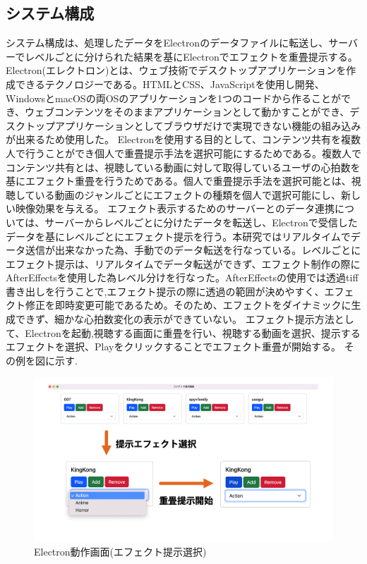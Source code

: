 \subsection{システム構成}
システム構成は、処理したデータをElectronのデータファイルに転送し、サーバーでレベルごとに分けられた結果を基にElectronでエフェクトを重畳提示する。
Electron(エレクトロン)とは、ウェブ技術でデスクトップアプリケーションを作成できるテクノロジーである。HTMLとCSS、JavaScriptを使用し開発、WindowsとmacOSの両OSのアプリケーションを1つのコードから作ることができ、ウェブコンテンツをそのままアプリケーションとして動かすことができ、デスクトップアプリケーションとしてブラウザだけで実現できない機能の組み込みが出来るため使用した。
Electronを使用する目的として、コンテンツ共有を複数人で行うことができ個人で重畳提示手法を選択可能にするためである。複数人でコンテンツ共有とは、視聴している動画に対して取得しているユーザの心拍数を基にエフェクト重畳を行うためである。個人で重畳提示手法を選択可能とは、視聴している動画のジャンルごとにエフェクトの種類を個人で選択可能にし、新しい映像効果を与える。
エフェクト表示するためのサーバーとのデータ連携については、サーバーからレベルごとに分けたデータを転送し、Electronで受信したデータを基にレベルごとにエフェクト提示を行う。本研究ではリアルタイムでデータ送信が出来なかった為、手動でのデータ転送を行なっている。レベルごとにエフェクト提示は、リアルタイムでデータ転送ができず、エフェクト制作の際にAfterEffectsを使用した為レベル分けを行なった。AfterEffectsの使用では透過tiff書き出しを行うことで,エフェクト提示の際に透過の範囲が決めやすく、エフェクト修正を即時変更可能であるため。そのため、エフェクトをダイナミックに生成できず、細かな心拍数変化の表示ができていない。
エフェクト提示方法として、Electronを起動,視聴する画面に重畳を行い、視聴する動画を選択、提示するエフェクトを選択、Playをクリックすることでエフェクト重畳が開始する。
その例を図に示す.

\begin{figure}[H]
    \centering
    \includegraphics[width=17cm]{images/chapter3/efect_setumei.png}
    \caption{Electron動作画面(エフェクト提示選択)}
\end{figure}

